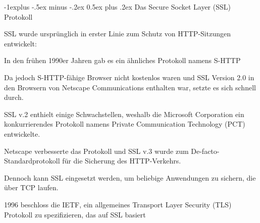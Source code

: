 \documentclass[a4paper]{article}
\makeatletter
\renewcommand{\subsection}{\@startsection{subsection}{2}{0mm}%
 {-1explus -.5ex minus -.2ex}%
 {0.5ex plus .2ex}%
 {\normalfont\normalsize\bfseries}}
\makeatother
\begin{document}
\begin{multicols}{3}
\begin{itemize*}
            \subsection{Das Secure Socket Layer (SSL)
                  Protokoll}
            \begin{itemize*}
                  \item SSL wurde ursprünglich in erster Linie zum Schutz von HTTP-Sitzungen
                  entwickelt:
                  \begin{itemize*}
                        \item In den frühen 1990er Jahren gab es ein ähnliches Protokoll namens S-HTTP
                        \item Da jedoch S-HTTP-fähige Browser nicht kostenlos waren und SSL Version 2.0 in den Browsern von Netscape Communications enthalten war, setzte es sich schnell durch.
                        \item SSL v.2 enthielt einige Schwachstellen, weshalb die Microsoft Corporation ein konkurrierendes Protokoll namens Private Communication Technology (PCT) entwickelte.
                        \item Netscape verbesserte das Protokoll und SSL v.3 wurde zum De-facto-Standardprotokoll für die Sicherung des HTTP-Verkehrs.
                        \item Dennoch kann SSL eingesetzt werden, um beliebige Anwendungen zu sichern, die über TCP laufen.
                        \item 1996 beschloss die IETF, ein allgemeines Transport Layer Security (TLS) Protokoll zu spezifizieren, das auf SSL basiert
                  \end{itemize*}
            \end{itemize*}


\end{itemize*}
\end{multicols}
\end{document}

